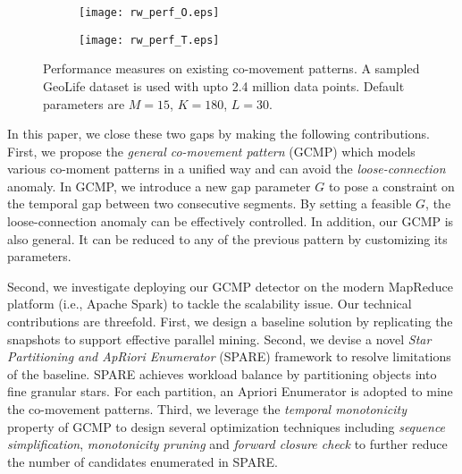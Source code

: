\begin{figure}[h]
    \centering
    \begin{subfigure}[b]{0.23\textwidth}
            \centering
            \texttt{[image: rw\_perf\_O.eps]}
    \label{fig:fig1}
    \end{subfigure}
    \begin{subfigure}[b]{0.23\textwidth}
            \centering
            \texttt{[image: rw\_perf\_T.eps]}
    \label{fig:fig2}
    \end{subfigure}
    \caption{Performance measures on existing co-movement patterns. A sampled GeoLife dataset
    is used with upto 2.4 million data points. Default parameters are $M=15$, $K=180$, $L=30$.}
    \label{fig:related_work_scalability}
\end{figure}
%
%
%
In this paper, we close these two gaps by making the following contributions.
First, we propose the \emph{general co-movement pattern} (GCMP) which models
various co-moment patterns in a unified way and can avoid 
the \emph{loose-connection} anomaly. In GCMP,
we introduce a new gap parameter $G$ to pose a constraint on the temporal gap between two consecutive segments. 
By setting a feasible $G$, the loose-connection anomaly can be effectively controlled. In addition, our GCMP is also general. It can be reduced to any of the previous pattern by customizing its parameters.

Second, we investigate deploying our GCMP detector on the modern MapReduce platform (i.e., Apache Spark) to tackle the scalability issue. Our technical contributions are threefold. First, we design a baseline solution by replicating the snapshots 
to support effective parallel mining. 
Second, we devise a novel \emph{Star Partitioning and ApRiori Enumerator} (SPARE) framework to resolve limitations of the baseline. 
SPARE achieves workload balance by partitioning objects into fine granular stars. 
For each partition, an Apriori Enumerator is adopted to mine the co-movement patterns. 
Third, we leverage the \emph{temporal monotonicity} property of GCMP 
to design several optimization techniques including \emph{sequence simplification}, \emph{monotonicity pruning} and \emph{forward closure check} to further reduce the number of candidates enumerated in SPARE.


